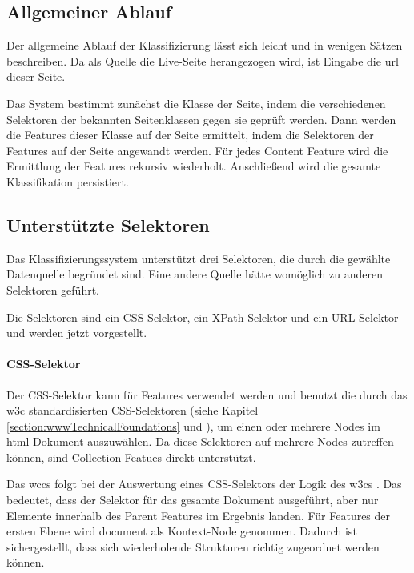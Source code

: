     \subsection{Allgemeiner Ablauf}
        Der allgemeine Ablauf der Klassifizierung lässt sich leicht und in wenigen Sätzen beschreiben.
        Da als Quelle die Live-Seite herangezogen wird, ist Eingabe die \gls{url} dieser Seite.

        Das System bestimmt zunächst die Klasse der Seite, indem die verschiedenen Selektoren der bekannten
        Seitenklassen gegen sie geprüft werden.
        Dann werden die Features dieser Klasse auf der Seite ermittelt,
        indem die Selektoren der Features auf der Seite angewandt werden.
        Für jedes Content Feature wird die Ermittlung der Features rekursiv wiederholt.
        Anschließend wird die gesamte Klassifikation persistiert.

    \subsection{Unterstützte Selektoren}
        \label{section:conceptSupportedSelectors}
        Das Klassifizierungssystem unterstützt drei Selektoren,
        die durch die gewählte Datenquelle begründet sind.
        Eine andere Quelle hätte womöglich zu anderen Selektoren geführt.

        Die Selektoren sind ein CSS-Selektor, ein XPath-Selektor und ein URL-Selektor
        und werden jetzt vorgestellt.

        \paragraph{CSS-Selektor}
        Der CSS-Selektor kann für Features verwendet werden und benutzt
        die durch das \gls{w3c} standardisierten CSS-Selektoren
        (siehe Kapitel \ref{section:wwwTechnicalFoundations} und \cite{w3c:cssSelectors}),
        um einen oder mehrere Nodes im \gls{html}-Dokument auszuwählen.
        Da diese Selektoren auf mehrere Nodes zutreffen können,
        sind Collection Featues direkt unterstützt.

        Das \gls{wccs} folgt bei der Auswertung eines CSS-Selektors der Logik des \glspl{w3c}
        \cite{w3c:selectorsAPI}.
        Das bedeutet, dass der Selektor für das gesamte Dokument ausgeführt,
        aber nur Elemente innerhalb des Parent Features im Ergebnis landen.
        Für Features der ersten Ebene wird document als Kontext-Node genommen.
        Dadurch ist sichergestellt, dass sich wiederholende Strukturen richtig zugeordnet werden können.

